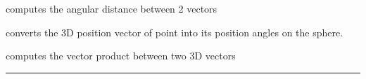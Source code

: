 \begin{related}
  \begin{sulist}{} %
  \item[\htmlref{angdist}{sub:angdist}] computes the angular distance between 2 vectors
  \item[\htmlref{vec2ang}{sub:vec2ang}] converts the 3D position vector of point into its position
  angles on the sphere.
  \item[\htmlref{vect\_prod}{sub:vect_prod}] computes the vector product between two 3D vectors
  \end{sulist}
\end{related}

\rule{\hsize}{2mm}

